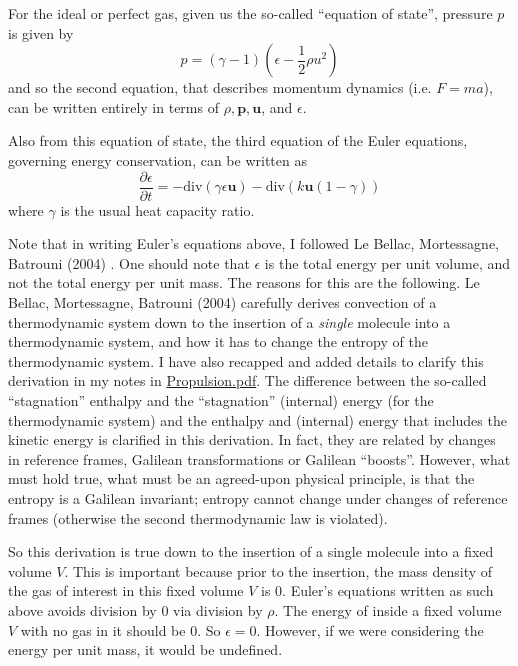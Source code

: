 \documentclass[10pt, landscape]{amsart}
\begin{document}
For the ideal or perfect gas, given us the so-called ``equation of state'', pressure $p$ is given by
\[
p = (\gamma - 1) (\epsilon - \frac{1}{2} \rho u^2)
\]
and so the second equation, that describes momentum dynamics (i.e. $F=ma$), can be written entirely in terms of $\rho, \mathbf{p}, \mathbf{u}$, and $\epsilon$.

Also from this equation of state, the third equation of the Euler equations, governing energy conservation, can be written as
\[
\frac{ \partial \epsilon }{ \partial t} = -\text{div}(\gamma \epsilon \mathbf{u}) - \text{div}(k\mathbf{u}(1-\gamma ) )
\]
where $\gamma$ is the usual heat capacity ratio.  

Note that in writing Euler's equations above, I followed Le Bellac, Mortessagne, Batrouni (2004) \cite{MLeBellacFMortessagneGBatrouni2004}.  One should note that $\epsilon$ is the total energy per unit volume, and not the total energy per unit mass.  The reasons for this are the following.  Le Bellac, Mortessagne, Batrouni (2004) \cite{MLeBellacFMortessagneGBatrouni2004} carefully derives convection of a thermodynamic system down to the insertion of a \emph{single} molecule into a thermodynamic system, and how it has to change the entropy of the thermodynamic system.  I have also recapped and added details to clarify this derivation in my notes in \href{https://github.com/ernestyalumni/Propulsion/blob/master/LaTeXandpdfs/Propulsion.pdf}{Propulsion.pdf}.  The difference between the so-called ``stagnation'' enthalpy and the ``stagnation'' (internal) energy (for the thermodynamic system) and the enthalpy and (internal) energy that includes the kinetic energy is clarified in this derivation.  In fact, they are related by changes in reference frames, Galilean transformations or Galilean ``boosts''.  However, what must hold true, what must be an agreed-upon physical principle, is that the entropy is a Galilean invariant; entropy cannot change under changes of reference frames (otherwise the second thermodynamic law is violated).

So this derivation is true down to the insertion of a single molecule into a fixed volume $V$.  This is important because prior to the insertion, the mass density of the gas of interest in this fixed volume $V$ is $0$.  Euler's equations written as such above avoids division by $0$ via division by $\rho$.  The energy of inside a fixed volume $V$ with no gas in it should be $0$.  So $\epsilon =0$.  However, if we were considering the energy per unit mass, it would be undefined.
\end{document}
